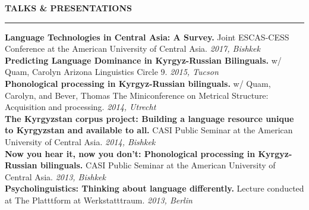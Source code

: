 \documentclass{resume} %
\begin{document}
\begin{minipage}{\textwidth}

\sectionskip
\MakeUppercase{\textbf{Talks \& Presentations}}
  \sectionlineskip
  \hrule
\vspace{.5cm}

{\bf Language Technologies in Central Asia: A Survey.} {Joint ESCAS-CESS Conference at the American University of Central Asia.} \hfill {\em 2017, Bishkek} \\

{\bf Predicting Language Dominance in Kyrgyz-Russian Bilinguals.} {w/ Quam, Carolyn} {Arizona Linguistics Circle 9.} \hfill {\em 2015, Tucson} \\

{\bf Phonological processing in Kyrgyz-Russian bilinguals.} {w/ Quam, Carolyn, and Bever, Thomas} {The Miniconference on Metrical Structure: Acquisition and processing.} \hfill {\em 2014, Utrecht} \\

{\bf The Kyrgyzstan corpus project: Building a language resource unique to Kyrgyzstan and available to all.} {CASI Public Seminar at the American University of Central Asia.} \hfill {\em 2014, Bishkek} \\

{\bf Now you hear it, now you don’t: Phonological processing in Kyrgyz-Russian bilinguals.} {CASI Public Seminar at the American University of Central Asia.} \hfill {\em 2013, Bishkek} \\

{\bf Psycholinguistics: Thinking about language differently.} {Lecture conducted at The Platttform at Werkstatttraum.} \hfill {\em 2013, Berlin} \\


\end{minipage}





\end{document}
